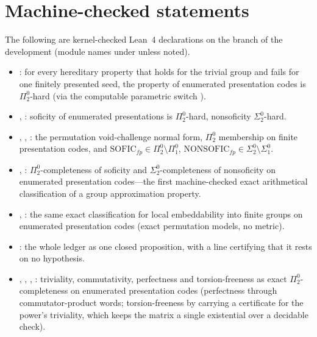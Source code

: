 \documentclass[11pt]{article}
\theoremstyle{definition}
\newcommand{\Pizt}{\Pi^0_2}\newcommand{\Sizt}{\Sigma^0_2}\newcommand{\Pith}{\Pi^0_3}\newcommand{\Sith}{\Sigma^0_3}
\newcommand{\Sio}{\Sigma^0_1}\newcommand{\Pio}{\Pi^0_1}
\begin{document}
\section{Machine-checked statements}
The following are kernel-checked Lean~4 declarations on the  branch of the development (module names under  unless noted).
\begin{itemize}
\item {}: for every hereditary property that holds for the trivial group and fails for one finitely presented seed, the property of enumerated presentation codes is $\Pizt$-hard (via the computable parametric switch ).
\item {}, : soficity of enumerated presentations is $\Pizt$-hard, nonsoficity $\Sizt$-hard.
\item {}, , : the permutation void-challenge normal form, $\Pizt$ membership on finite presentation codes, and $\mathrm{SOFIC}_{fp}\in\Pizt\setminus\Pio$, $\mathrm{NONSOFIC}_{fp}\in\Sizt\setminus\Sio$.
\item {}, : $\Pizt$-completeness of soficity and $\Sizt$-completeness of nonsoficity on enumerated presentation codes---the first machine-checked exact arithmetical classification of a group approximation property.
\item {}, : the same exact classification for local embeddability into finite groups on enumerated presentation codes (exact permutation models, no metric).
\item {}: the whole ledger as one closed proposition, with a  line certifying that it rests on no hypothesis.
\item {}, , , : triviality, commutativity, perfectness and torsion-freeness as exact $\Pizt$-completeness on enumerated presentation codes (perfectness through commutator-product words; torsion-freeness by carrying a certificate for the power's triviality, which keeps the matrix a single existential over a decidable check).

\end{itemize}
\end{document}
